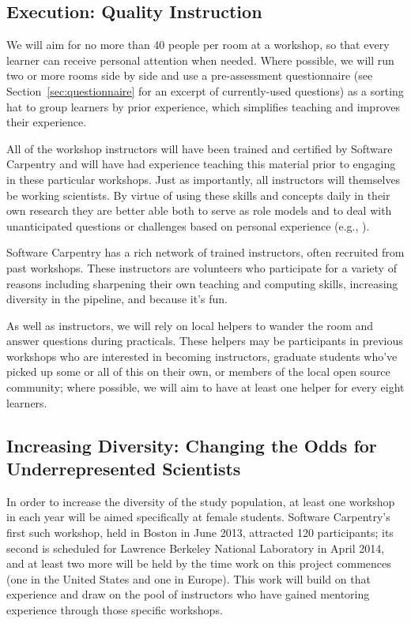 \documentclass{proposalnsf}
\newlength{\up}
\begin{document}
\subsection{Execution: Quality Instruction}
We will aim for no more than 40 people per room at a workshop, so that
every learner can receive personal attention when needed.  Where
possible, we will run two or more rooms side by side and use a
pre-assessment questionnaire (see Section~\ref{sec:questionnaire} for an excerpt 
of currently-used questions) as a sorting hat to group learners by
prior experience, which simplifies teaching and improves their
experience.  %

All of the workshop instructors will have been trained and certified
by Software Carpentry and will have had experience teaching this
material prior to engaging in these particular workshops.  Just as
importantly, all instructors will themselves be working scientists. By virtue of 
using  these skills and concepts daily in their own research they are better 
able both to serve as role models and to deal with unanticipated
questions or challenges based on personal experience (e.g.,
\cite{ram2013}). 

Software Carpentry has a rich network of trained instructors, often recruited 
from past workshops. These instructors are volunteers who participate for a 
variety of reasons including sharpening their own teaching and computing skills, 
increasing diversity in the pipeline, and because it's fun. 

As well as instructors, we will rely on local helpers to wander the room and
answer questions during practicals. These helpers may be participants in
previous workshops who are interested in becoming instructors, graduate
students who've picked up some or all of this on their own, or members
of the local open source community; where possible, we will aim to have at
least one helper for every eight learners.

\subsection{Increasing Diversity: Changing the Odds for Underrepresented Scientists}
\label{sec:diversity}

In order to increase the diversity of the study population, at least
one workshop in each year will be aimed specifically at female
students.  Software Carpentry's first such workshop, held in Boston in
June 2013, attracted 120 participants; its second is scheduled for
Lawrence Berkeley National Laboratory in April 2014, and at least two
more will be held by the time work on this project commences (one in
the United States and one in Europe).  This work will build on that
experience and draw on the pool of instructors who have gained
mentoring experience through those specific workshops.
\end{document}

